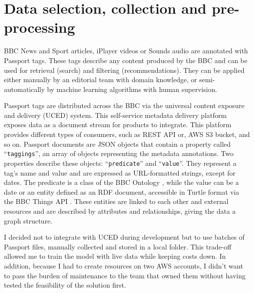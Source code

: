 
\section{Data selection, collection and pre-processing}


BBC News and Sport articles, iPlayer videos or Sounds audio are annotated with Passport tags.
These tags describe any content produced by the BBC and can be used for retrieval (search) and filtering (recommendations).
They can be applied either manually by an editorial team with domain knowledge,
or semi-automatically by machine learning algorithms with human supervision.

Passport tags are distributed across the BBC via the universal content exposure and delivery (UCED) system.
This self-service metadata delivery platform exposes data as a document stream for products to integrate.
This platform provides different types of consumers, such as REST API or, AWS S3 bucket, and so on.
Passport documents are JSON objects that contain a property called ``\verb|taggings|'', an array of objects representing the
metadata annotations. Two properties describe these objects: ``\verb|predicate|'' and ``\verb|value|''.
They represent a tag's name and value and are expressed as URL-formatted strings, except for dates.
The predicate is a class of the BBC Ontology \cite{BBC:Ontologies},
while the value can be a date or an entity defined as an RDF \cite{W3C:RDF,W3C:RDF:Concepts} document,
accessible in Turtle format \cite{W3C:Turtle} via the BBC Things API \cite{BBC:Things,BBC:Things:About,BBC:Things:API}.
These entities are linked to each other and external resources and are described by attributes and relationships,
giving the data a graph structure.


I decided not to integrate with UCED during development but to use batches of Passport files,
manually collected and stored in a local folder.
This trade-off allowed me to train the model with live data while keeping costs down.
In addition, because I had to create resources on two AWS accounts,
I didn't want to pass the burden of maintenance to the team that owned them without having tested the feasibility of the solution first.

